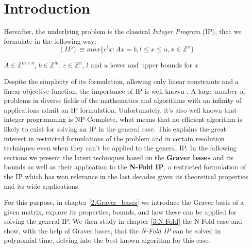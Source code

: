 \chapter{Introduction} \label{1.Introduction}

Hereafter, the underlying problem is the classical \textit{Integer Program} (IP), that we formulate in the following way:
\begin{equation*}
    (IP) \equiv max\{c^tx : Ax = b, l \leq x \leq u, x \in \mathbb{Z}^n \}
\end{equation*}
\vspace{-50pt}
\begin{center}
$A \in \mathbb{Z}^{m \times n}$, $b \in \mathbb{Z}^m$, $c \in \mathbb{Z}^n$, $l$  and $u$ lower and upper bounds for $x$
\end{center}


Despite the simplicity of its formulation, allowing only linear constraints and a linear objective function, the importance of IP is well known . A large number of problems in diverse fields of the mathematics and algorithms with an infinity of applications admit an IP formulation. Unfortunately, it's also well known that integer programming is NP-Complete, what means that no efficient algorithm is likely to exist for solving an IP in the general case. This explains the great interest in restricted formulations of the problem and in certain resolution techniques even when they can't be applied to the general IP. In the following sections we present the latest techniques based on the \textbf{Graver bases} and its bounds as well as their application to the \textbf{N-Fold IP}, a restricted formulation of the IP which has won relevance in the last decades given its theoretical properties and its wide applications. 

For this purpose, in chapter \ref{2.Graver_bases} we introduce the Graver basis of a given matrix, explore its properties, bounds, and how these can be applied for solving the general IP. We then study in chapter \ref{3.N-Fold} the N-Fold case and show, with the help of Graver bases, that the \emph{N-Fold IP} can be solved in polynomial time, delving into the best known algorithm for this case.


%

